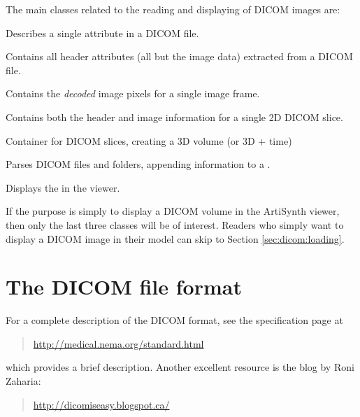 The main classes related to the reading and displaying of DICOM images are:
\begin{lstdescription}
   \item[{\protect \javaclass[maspack.image.dicom]{DicomElement}}] Describes a single attribute in a DICOM file.
   \item[{\protect \javaclass[maspack.image.dicom]{DicomHeader}}] Contains all header attributes (all but the image data) extracted from a DICOM file.
   \item[{\protect \javaclass[maspack.image.dicom]{DicomPixelBuffer}}] Contains the \emph{decoded} image pixels for a single image frame.
   \item[{\protect \javaclass[maspack.image.dicom]{DicomSlice}}] Contains both the header and image information for a single 2D DICOM slice.
   \item[{\protect \javaclass[maspack.image.dicom]{DicomImage}}] Container for DICOM slices, creating a 3D volume (or 3D + time)
   \item[{\protect \javaclass[maspack.image.dicom]{DicomReader}}] Parses DICOM files and folders, appending information to a . 
   \item[{\protect \javaclass[artisynth.core.renderables]{DicomViewer}}] Displays the  in the viewer.
\end{lstdescription}
If the purpose is simply to display a DICOM volume in the ArtiSynth viewer, then only the last three classes will be of interest.  Readers who simply want to display a DICOM image in their model can skip to Section \ref{sec:dicom:loading}.

\section{The DICOM file format}

For a complete description of the DICOM format, see the specification page at 
\begin{quote}
\url{http://medical.nema.org/standard.html}
\end{quote}
which provides a brief description.  Another excellent resource is the
blog by Roni Zaharia: 
\begin{quote}
\url{http://dicomiseasy.blogspot.ca/}
\end{quote}

